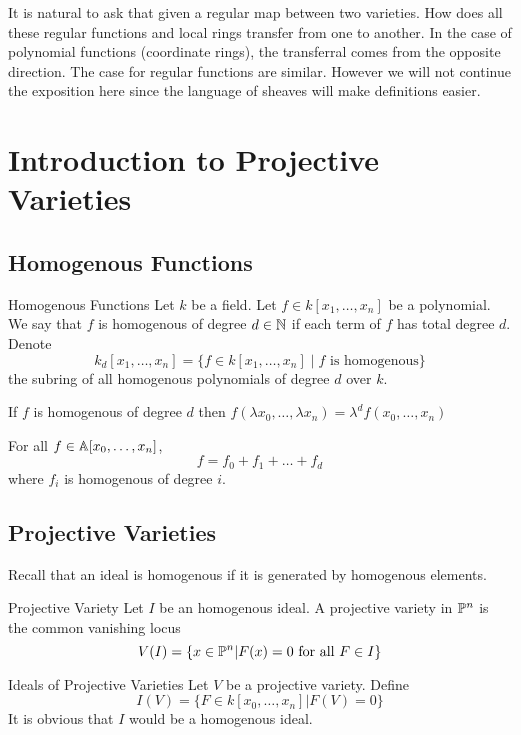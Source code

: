 \documentclass[a4paper]{article}
\begin{document}
It is natural to ask that given a regular map between two varieties. How does all these regular functions and local rings transfer from one to another. In the case of polynomial functions (coordinate rings), the transferral comes from the opposite direction. The case for regular functions are similar. However we will not continue the exposition here since the language of sheaves will make definitions easier. 

\pagebreak
\section{Introduction to Projective Varieties}
\subsection{Homogenous Functions}
\begin{defn}{Homogenous Functions}{} Let $k$ be a field. Let $f\in k[x_1,\dots,x_n]$ be a polynomial. We say that $f$ is homogenous of degree $d\in\mathbb{N}$ if each term of $f$ has total degree $d$. Denote $$k_d[x_1,\dots,x_n]=\{f\in k[x_1,\dots,x_n]\;|\;f\text{ is homogenous}\}$$ the subring of all homogenous polynomials of degree $d$ over $k$. 
\end{defn}

\begin{lmm}{}{} If $f$ is homogenous of degree $d$ then $f(\lambda x_0,\dots,\lambda x_n)=\lambda^df(x_0,\dots,x_n)$
\end{lmm}

\begin{lmm}{}{} For all $f\in\mathbb{A}[x_0,\dots,x_n]$, $$f=f_0+f_1+\dots+f_d$$ where $f_i$ is homogenous of degree $i$. 
\end{lmm}

\subsection{Projective Varieties}
Recall that an ideal is homogenous if it is generated by homogenous elements. 

\begin{defn}{Projective Variety}{} Let $I$ be an homogenous ideal. A projective variety in $\mathbb{P}^n$ is the common vanishing locus $$V(I)=\{x\in\mathbb{P}^n|F(x)=0\text{ for all }F\in I\}$$ 
\end{defn}

\begin{defn}{Ideals of Projective Varieties}{} Let $V$ be a projective variety. Define $$I(V)=\{F\in k[x_0,\dots,x_n]|F(V)=0\}$$ It is obvious that $I$ would be a homogenous ideal. 
\end{defn}
\end{document}
